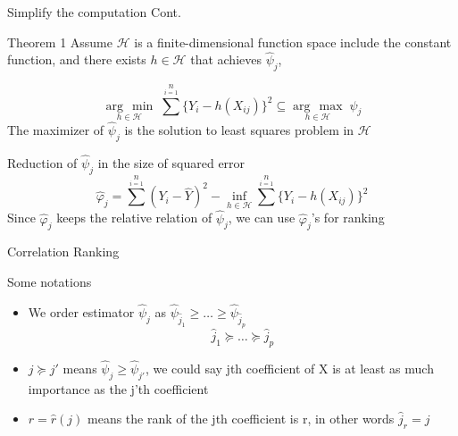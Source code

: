 \documentclass[ignorenonframetext,]{beamer}
\newcommand{\argmax}[1]{\underset{#1}{\operatorname{arg}\,\operatorname{max}}\;}
\newcommand{\argmin}[1]{\underset{#1}{\operatorname{arg}\,\operatorname{min}}\;}
\begin{document}
\begin{frame}{Simplify the computation Cont.}

\begin{block}{Theorem 1}
Assume $\mathcal{H}$ is a finite-dimensional function space include the constant function, and there exists $ h\in\mathcal{H}$ that achieves $\hat{\psi}_j$,

\[
\argmin{h \in \mathcal{H}} \sum^n\limits_{i = 1}\{Y_i - h(X_{ij})\}^2 \subseteq \argmax{h \in \mathcal{H}} \hat{\psi}_j
\]
The maximizer of $\hat{\psi}_j$ is the solution to least squares problem in $\mathcal{H}$
\end{block}

\begin{block}{Reduction of $\hat{\psi}_j$ in the size of squared error}
\[
  \hat{\varphi}_j = \sum^n\limits_{i = 1} (Y_i - \hat{Y})^2 - \inf\limits_{h \in \mathcal{H}}\sum^n\limits_{i = 1}\{Y_i - h(X_{ij})\}^2
\]
Since $\hat{\varphi}_j$ keeps the relative relation of $\hat{\psi}_j$, we can use $\hat{\varphi}_j$'s for ranking
\end{block}

\end{frame}

\begin{frame}{Correlation Ranking}

\begin{block}{Some notations}

\begin{itemize}
\item
  We order estimator \(\hat{\psi}_j\) as
  \(\hat{\psi}_{\hat{j}_1} \geq \dots \geq \hat{\psi}_{\hat{j}_p}\) \[
    \hat{j}_1 \succeq \dots \succeq \hat{j}_p
  \]
\item
  \(j \succeq j'\) means \(\hat{\psi}_j \geq \hat{\psi}_{j'}\), we could
  say jth coefficient of X is at least as much importance as the j'th
  coefficient
\item
  \(r = \hat{r}(j)\) means the rank of the jth coefficient is r, in
  other words \(\hat{j}_r = j\)
\end{itemize}

\end{block}

\end{frame}
\end{document}

